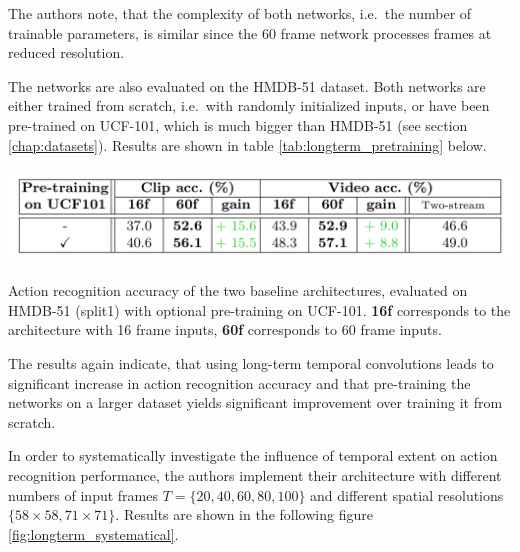 The authors note, that the complexity of both networks, i.e.\ the number of trainable parameters, is similar since the 60 frame network processes frames at reduced resolution.

The networks are also evaluated on the HMDB-51 dataset.
Both networks are either trained from scratch, i.e.\ with randomly initialized inputs, or have been pre-trained on UCF-101, which is much bigger than HMDB-51 (see section \ref{chap:datasets}).
Results are shown in table \ref{tab:longterm_pretraining} below.

\begin{table}[H]
    \centering
    \includegraphics[width=\textwidth]{img_deep/longterm_pretraining}
    \caption{Action recognition accuracy of the two baseline architectures, evaluated on HMDB-51 (split1) with optional pre-training on UCF-101. \textbf{16f} corresponds to the architecture with 16 frame inputs, \textbf{60f} corresponds to 60 frame inputs. \cite{varol_long-term_2016}}
    \label{tab:longterm_pretraining}
\end{table}

The results again indicate, that using long-term temporal convolutions leads to significant increase in action recognition accuracy and that pre-training the networks on a larger dataset yields significant improvement over training it from scratch. 

In order to systematically investigate the influence of temporal extent on action recognition performance, the authors implement their architecture with different numbers of input frames $T = \{20, 40, 60, 80, 100\}$ and different spatial resolutions $\{58 \times 58, 71 \times 71\}$.
Results are shown in the following figure \ref{fig:longterm_systematical}.

